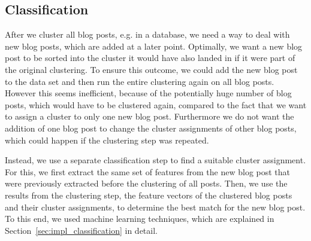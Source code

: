 
\subsection{Classification}
\label{sec:classification}



After we cluster all blog posts, e.g. in a database, we need a way to deal with new blog posts, which are added at a later point.
Optimally, we want a new blog post to be sorted into the cluster it would have also landed in if it were part of the original clustering.
To ensure this outcome, we could add the new blog post to the data set and then run the entire clustering again on all blog posts.
However this seems inefficient, because of the potentially huge number of blog posts, which would have to be clustered again, compared to the fact that we want to assign a cluster to only one new blog post.
Furthermore we do not want the addition of one blog post to change the cluster assignments of other blog posts, which could happen if the clustering step was repeated.


Instead, we use a separate classification step to find a suitable cluster assignment.
For this, we first extract the same set of features from the new blog post that were previously extracted before the clustering of all posts.
Then, we use the results from the clustering step, the feature vectors of the clustered blog posts and their cluster assignments, to determine the best match for the new blog post.
To this end, we used machine learning techniques, which are explained in Section~\ref{sec:impl_classification} in detail.
